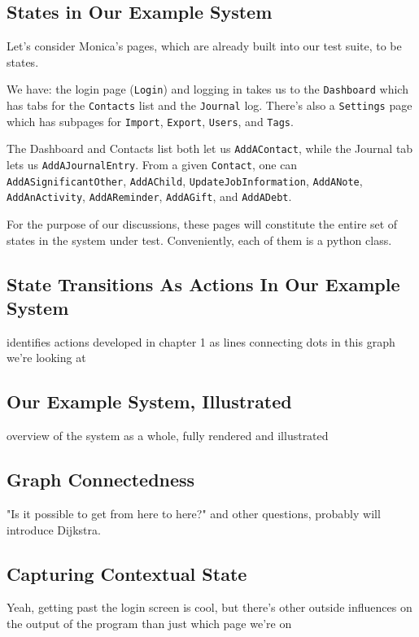 \subsection{States in Our Example System}
Let's consider Monica's pages, which are already built into our test suite, to be states.

We have: the login page (\texttt{Login}) and logging in takes us to the \texttt{Dashboard} which has tabs for the \texttt{Contacts} list and the \texttt{Journal} log. There's also a \texttt{Settings} page which has subpages for \texttt{Import}, \texttt{Export}, \texttt{Users}, and \texttt{Tags}.

The Dashboard and Contacts list both let us \texttt{AddAContact}, while the Journal tab lets us \texttt{AddAJournalEntry}. From a given \texttt{Contact}, one can \texttt{AddASignificantOther}, \texttt{AddAChild}, \texttt{UpdateJobInformation}, \texttt{AddANote}, \texttt{AddAnActivity}, \texttt{AddAReminder}, \texttt{AddAGift}, and \texttt{AddADebt}.

For the purpose of our discussions, these pages will constitute the entire set of states in the system under test. Conveniently, each of them is a python class.

\subsection{State Transitions As Actions In Our Example System}
identifies actions developed in chapter 1 as lines connecting dots in this graph we're looking at

\subsection{Our Example System, Illustrated}
overview of the system as a whole, fully rendered and illustrated

\subsection{Graph Connectedness}
"Is it possible to get from here to here?" and other questions, probably will introduce Dijkstra.

\subsection{Capturing Contextual State}
Yeah, getting past the login screen is cool, but there's other outside influences on the output of the program than just which page we're on

